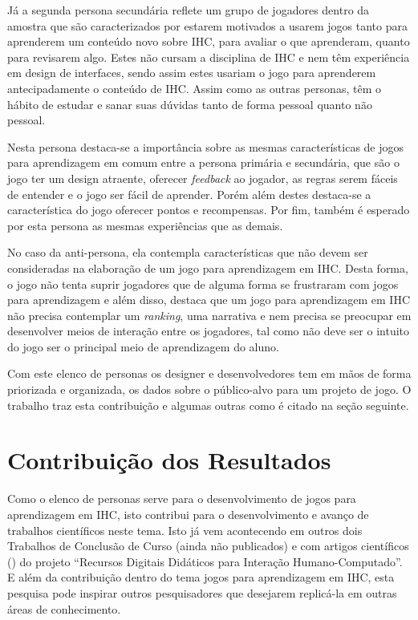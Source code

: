 Já a segunda persona secundária reflete um grupo de jogadores dentro da amostra que são caracterizados por estarem motivados a usarem jogos tanto para aprenderem um conteúdo novo sobre IHC, para avaliar o que aprenderam, quanto para revisarem algo. Estes não cursam a disciplina de IHC e nem têm experiência em design de interfaces, sendo assim estes usariam o jogo para aprenderem antecipadamente o conteúdo de IHC. Assim como as outras personas, têm o hábito de estudar e sanar suas dúvidas tanto de forma pessoal quanto não pessoal.

Nesta persona destaca-se a importância sobre as mesmas características de jogos para aprendizagem em comum entre a persona primária e secundária, que são o jogo ter um design atraente, oferecer \textit{feedback} ao jogador, as regras serem fáceis de entender e o jogo ser fácil de aprender. Porém além destes destaca-se a característica do jogo oferecer pontos e recompensas. Por fim, também é esperado por esta persona as mesmas experiências que as demais.

No caso da anti-persona, ela contempla características que não devem ser consideradas na elaboração de um jogo para aprendizagem em IHC. Desta forma, o jogo não tenta suprir jogadores que de alguma forma se frustraram com jogos para aprendizagem e além disso, destaca que um jogo para aprendizagem em IHC não precisa contemplar um \textit{ranking}, uma narrativa e nem precisa se preocupar em desenvolver meios de interação entre os jogadores, tal como não deve ser o intuito do jogo ser o principal meio de aprendizagem do aluno.

Com este elenco de personas os designer e desenvolvedores tem em mãos de forma priorizada e organizada, os dados sobre o público-alvo para um projeto de jogo. O trabalho traz esta contribuição e algumas outras como é citado na seção seguinte.

\section{Contribuição dos Resultados}

Como o elenco de personas serve para o desenvolvimento de jogos para aprendizagem em IHC, isto contribui para o desenvolvimento e avanço de trabalhos científicos neste tema. Isto já vem acontecendo em outros dois Trabalhos de Conclusão de Curso (ainda não publicados) e com artigos científicos (\cite{deSales_SousaeSilva_2020, silva_sales_mendes2021, sales_joao_2021}) do projeto ``Recursos Digitais Didáticos para Interação Humano-Computado''. E além da contribuição dentro do tema jogos para aprendizagem em IHC, esta pesquisa pode inspirar outros pesquisadores que desejarem replicá-la em outras áreas de conhecimento.

